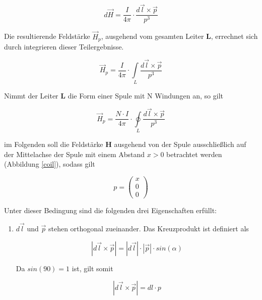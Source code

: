 {{\begin{equation}
  d\vec{H} = \frac{I}{4\pi} \cdot \frac{d\vec{l} \times \vec{p}}{p^3}
\end{equation}

\noindent Die resultierende Feldstärke \(\vec{H}_p\), ausgehend vom gesamten Leiter \textbf{L}, errechnet sich durch integrieren dieser Teilergebnisse.

\begin{equation}
  \vec{H}_p = \frac{I}{4\pi} \cdot \int\limits_L \frac{d\vec{l} \times \vec{p}}{p^3}
\end{equation}

\noindent Nimmt der Leiter \textbf{L} die Form einer Spule mit N Windungen an, so gilt

\begin{equation}
  \vec{H}_p = \frac{N \cdot I}{4\pi} \cdot \oint\limits_L \frac{d\vec{l} \times \vec{p}}{p^3}
  \label{eq:savatCoil}
\end{equation}

\noindent im Folgenden soll die Feldstärke \textbf{H} ausgehend von der Spule ausschließlich auf der Mittelachse der Spule mit einem Abstand \(x > 0\) betrachtet werden (Abbildung \ref{coil}), sodass gilt

\begin{equation}
  p = \left(\begin{array}{c} x \\ 0 \\ 0 \end{array}\right)
\end{equation}

\clearpage

\noindent Unter dieser Bedingung sind die folgenden drei Eigenschaften erfüllt: 

\begin{enumerate}
  \item \(d\vec{l}\) und \(\vec{p}\) stehen orthogonal zueinander. Das Kreuzprodukt ist definiert als
  
  \begin{equation}
    |d\vec{l} \times \vec{p}| = |d\vec{l}| \cdot |\vec{p}| \cdot sin(\alpha)
  \end{equation}
  
  Da \(sin(90) = 1\) ist, gilt somit
  
  \begin{equation}
    |d\vec{l} \times \vec{p}| = dl \cdot p
  \end{equation} 
  

\end{enumerate}}}
